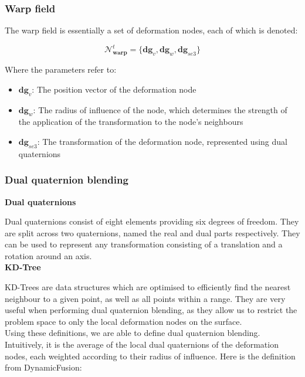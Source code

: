 \documentclass[a4paper]{article}
\begin{document}
\subsubsection{Warp field}

The warp field is essentially a set of deformation nodes, each of which is denoted:

$$\mathcal{N}^t_{\textbf{warp}}=\{ \textbf{dg}_v, \textbf{dg}_w, \textbf{dg}_{se3} \}$$

Where the parameters refer to:

\begin{itemize}
\item $\textbf{dg}_v$: The position vector of the deformation node

\item $\textbf{dg}_w$: The radius of influence of the node, which determines the strength of the application of the transformation to the node's neighbours

\item $\textbf{dg}_{se3}$: The transformation of the deformation node, represented using dual quaternions
\end{itemize}


\subsubsection{Dual quaternion blending}

\textbf{Dual quaternions}

Dual quaternions consist of eight elements providing six degrees of freedom. They are split across two quaternions, named the real and dual parts respectively.  They can be used to represent any transformation consisting of a translation and a rotation around an axis.\\

\noindent\textbf{KD-Tree}


KD-Trees\cite{kdtree} are data structures which are optimised to efficiently find the nearest neighbour to a given point, as well as all points within a range. They are very useful when performing dual quaternion blending, as they allow us to restrict the problem space to only the local deformation nodes on the surface.\\

Using these definitions, we are able to define dual quaternion blending. Intuitively, it is the average of the local dual quaternions of the deformation nodes, each weighted according to their radius of influence. Here is the definition from DynamicFusion:
\end{document}
